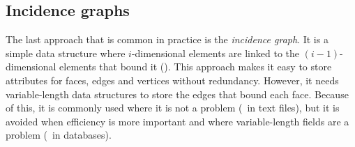 \subsection{Incidence graphs}

The last approach that is common in practice is the \emph{incidence graph}.
It is a simple data structure where \(i\)-dimensional elements are linked to the \((i-1)\)-dimensional elements that bound it ().
This approach makes it easy to store attributes for faces, edges and vertices without redundancy.
However, it needs variable-length data structures to store the edges that bound each face.
Because of this, it is commonly used where it is not a problem (\eg\ in text files), but it is avoided when efficiency is more important and where variable-length fields are a problem (\eg\ in databases).

